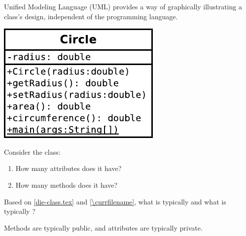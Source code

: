 
Unified Modeling Language (UML) provides a way of graphically illustrating a class's design, independent of the programming language.

\begin{center}
\includegraphics{Circle.pdf}
\end{center}




\Q Consider the  class:

\begin{enumerate}
\item How many attributes does it have?

\item How many methods does it have?
\end{enumerate}


\Q Based on \ref{die-class.tex} and \ref{\currfilename}, what is typically  and what is typically ?

\begin{answer}[2em]
Methods are typically public,
and attributes are typically private.
\end{answer}


%


%




